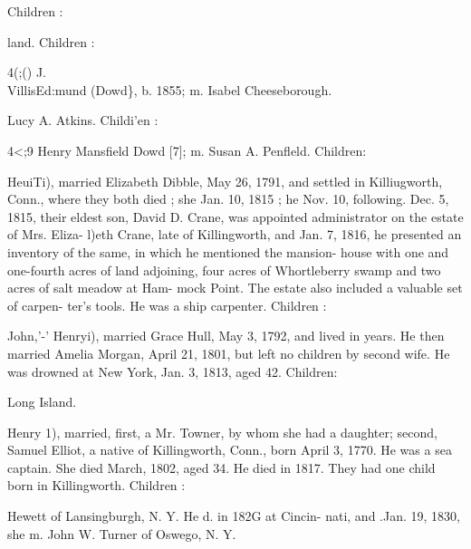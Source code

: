 \documentclass{book}
\begin{document}
Children : 








land. Children : 





4(;() J. \\VillisEd:mund (Dowd\}, b. 1855; m. Isabel Cheeseborough. 






Lucy A. Atkins. Childi'en : 



4<;9 Henry Mansfield Dowd [7]; m. Susan A. Penfleld. Children: 











HeuiTi), married Elizabeth Dibble, May 26, 1791, and settled 
in Killiugworth, Conn., where they both died ; she Jan. 10, 1815 ; 
he Nov. 10, following. Dec. 5, 1815, their eldest son, David D. 
Crane, was appointed administrator on the estate of Mrs. Eliza- 
l)eth Crane, late of Killingworth, and Jan. 7, 1816, he presented 
an inventory of the same, in which he mentioned the mansion- 
house with one and one-fourth acres of land adjoining, four acres 
of Whortleberry swamp and two acres of salt meadow at Ham- 
mock Point. The estate also included a valuable set of carpen- 
ter's tools. He was a ship carpenter. Children : 









John,'-' Henryi), married Grace Hull, May 3, 1792, and lived in 
years. He then married Amelia Morgan, April 21, 1801, but 
left no children by second wife. He was drowned at New York, 
Jan. 3, 1813, aged 42. Children: 


Long Island. 

Henry 1), married, first, a Mr. Towner, by whom she had a 
daughter; second, Samuel Elliot, a native of Killingworth, Conn., 
born April 3, 1770. He was a sea captain. She died March, 
1802, aged 34. He died in 1817. They had one child born in 
Killingworth. Children : 


Hewett of Lansingburgh, N. Y. He d. in 182G at Cincin- 
nati, and .Jan. 19, 1830, she m. John W. Turner of Oswego, 
N. Y. 
\end{document}
